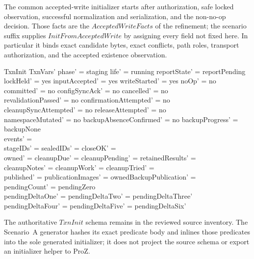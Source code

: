 \documentclass{article}
\begin{document}
The common accepted-write initializer starts after authorization, safe locked
observation, successful normalization and serialization, and the non-no-op
decision.  Those facts are the $AcceptedWriteFacts$ of the refinement; the
scenario suffix supplies $InitFromAcceptedWrite$ by assigning every field not
fixed here.  In particular it binds exact candidate bytes, exact conflicts,
path roles, transport authorization, and the accepted existence observation.

\begin{schema}{TxnInit}
	TxnVars'
	\where
	phase' = staging \land life' = running \land reportState' = reportPending \\
	lockHeld' = yes \land inputAccepted' = yes \land writeStarted' = yes \land
	noOp' = no \\
	committed' = no \land configSyncAck' = no \land cancelled' = no \\
	revalidationPassed' = no \land confirmationAttempted' = no \\
	cleanupSyncAttempted' = no \land releaseAttempted' = no \\
	namespaceMutated' = no \land backupAbsenceConfirmed' = no \land
	backupProgress' = backupNone \\
	events' = \emptyset \\
	stageIDs' = \emptyset \land sealedIDs' = \emptyset \land closeOK' = \emptyset \\
	owned' = \emptyset \land cleanupDue' = \emptyset \land
	cleanupPending' = \emptyset \land retainedResults' = \emptyset \\
	cleanupNotes' = \emptyset \land cleanupWork' = \emptyset \land
	cleanupTried' = \emptyset \\
	published' = \emptyset \land publicationImages' = \emptyset \land
	ownedBackupPublication' = \emptyset \\
	pendingCount' = pendingZero \\
	pendingDeltaOne' = pendingDeltaTwo' = pendingDeltaThree' \\
	pendingDeltaFour' = pendingDeltaFive' = pendingDeltaSix'
\end{schema}

The authoritative $TxnInit$ schema remains in the reviewed source inventory.
The Scenario~A generator hashes its exact predicate body and inlines those
predicates into the sole generated initializer; it does not project the source
schema or export an initializer helper to ProZ.
\end{document}
